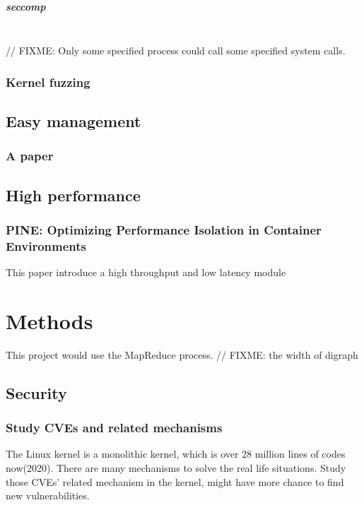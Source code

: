 \documentclass[12pt,a4paper,oneside]{IEEEconf}
\begin{document}
\subparagraph{seccomp}\mbox{}\\
// FIXME: Only some specified process could call some specified system calls.

\subsubsection{Kernel fuzzing}

\hypertarget{easy_management}{\subsection{Easy management}}
\subsubsection{A paper}

\hypertarget{heigh_performance}{\subsection{High performance}}
\subsubsection{PINE: Optimizing Performance Isolation in Container Environments}
This paper\cite{Optimizing} introduce a high throughput and low latency module



\section{Methods}
This project would use the MapReduce process.
// FIXME: the width of digraph


\subsection{Security}
\subsubsection{Study CVEs and related mechanisms}
The Linux kernel is a monolithic kernel, which is over 28 million lines of codes now(2020). There
are many mechanisms to solve the real life situations. Study those CVEs' related mechanism in the
kernel, might have more chance to find new vulnerabilities.
\end{document}
